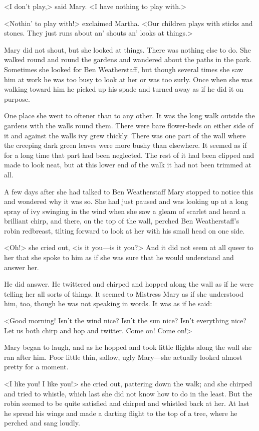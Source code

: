 <I don't play,> said Mary. <I have nothing to play with.>

<Nothin' to play with!> exclaimed Martha. <Our children plays with sticks and stones. They just runs about an' shouts an' looks at things.>

Mary did not shout, but she looked at things. There was nothing else to do. She walked round and round the gardens and wandered about the paths in the park. Sometimes she looked for Ben Weatherstaff, but though several times she saw him at work he was too busy to look at her or was too surly. Once when she was walking toward him he picked up his spade and turned away as if he did it on purpose.

One place she went to oftener than to any other. It was the long walk outside the gardens with the walls round them. There were bare flower-beds on either side of it and against the walls ivy grew thickly. There was one part of the wall where the creeping dark green leaves were more bushy than elsewhere. It seemed as if for a long time that part had been neglected. The rest of it had been clipped and made to look neat, but at this lower end of the walk it had not been trimmed at all.

A few days after she had talked to Ben Weatherstaff Mary stopped to notice this and wondered why it was so. She had just paused and was looking up at a long spray of ivy swinging in the wind when she saw a gleam of scarlet and heard a brilliant chirp, and there, on the top of the wall, perched Ben Weatherstaff's robin redbreast, tilting forward to look at her with his small head on one side.

<Oh!> she cried out, <is it you—is it you?> And it did not seem at all queer to her that she spoke to him as if she was sure that he would understand and answer her.

He did answer. He twittered and chirped and hopped along the wall as if he were telling her all sorts of things. It seemed to Mistress Mary as if she understood him, too, though he was not speaking in words. It was as if he said:

<Good morning! Isn't the wind nice? Isn't the sun nice? Isn't everything nice? Let us both chirp and hop and twitter. Come on! Come on!>

Mary began to laugh, and as he hopped and took little flights along the wall she ran after him. Poor little thin, sallow, ugly Mary—she actually looked almost pretty for a moment.

<I like you! I like you!> she cried out, pattering down the walk; and she chirped and tried to whistle, which last she did not know how to do in the least. But the robin seemed to be quite satisfied and chirped and whistled back at her. At last he spread his wings and made a darting flight to the top of a tree, where he perched and sang loudly.


